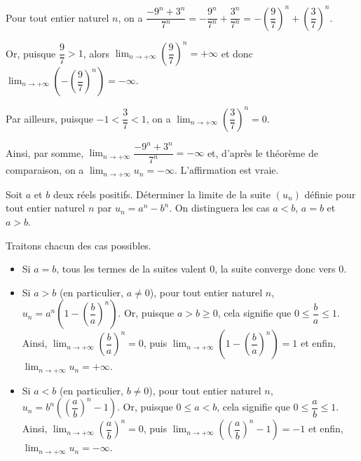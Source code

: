 \documentclass[11pt,fleqn, openany]{book} %
\begin{document}
\begin{solution}
Pour tout entier naturel $n$, on a $\dfrac{-9^n+3^n}{7^n}=-\dfrac{9^n}{7^n}+\dfrac{3^n}{7^n}=-\left(\dfrac{9}{7}\right)^n+\left(\dfrac{3}{7}\right)^n$.

Or, puisque $\dfrac{9}{7}>1$, alors $\displaystyle\lim_{n\to +\infty}\left(\dfrac{9}{7}\right)^n=+\infty$ et donc $\displaystyle\lim_{n\to +\infty}\left(-\left(\dfrac{9}{7}\right)^n\right)=-\infty$.

Par ailleurs, puisque $-1<\dfrac{3}{7}<1$, on a $\displaystyle\lim_{n\to +\infty}\left(\dfrac{3}{7}\right)^n=0$.

Ainsi, par somme, $\displaystyle\lim_{n\to +\infty}\dfrac{-9^n+3^n}{7^n}=-\infty$ et, d'après le théorème de comparaison, on a $\displaystyle\lim_{n \to +\infty}u_n=-\infty$. L'affirmation est vraie.
\end{solution}


\begin{exercise}
Soit $a$ et $b$ deux réels positifs. Déterminer la limite de la suite $(u_n)$ définie pour tout entier naturel $n$ par $u_n=a^n-b^n$. On distinguera les cas $a<b$, $a=b$ et $a>b$.
\newpage \end{exercise}

\begin{solution}Traitons chacun des cas possibles.
\begin{itemize}
\item Si $a=b$, tous les termes de la suites valent 0, la suite converge donc vers 0.
\item Si $a>b$ (en particulier, $a\neq 0$), pour tout entier naturel $n$, $u_n=a^n\left(1-\left( \dfrac{b}{a}\right)^n\right)$. Or, puisque $a>b \geqslant 0$, cela signifie que $0\leqslant \dfrac{b}{a} \leqslant 1$. Ainsi, $\displaystyle \lim_{n\to + \infty} \left(\dfrac{b}{a}\right)^n=0$, puis $\displaystyle \lim_{n\to + \infty} \left( 1-\left(\dfrac{b}{a}\right)^n\right)=1$ et enfin, $\displaystyle \lim_{n\to + \infty} u_n=+\infty$.
\item Si $a<b$ (en particulier, $b\neq 0$), pour tout entier naturel $n$, $u_n=b^n\left(\left( \dfrac{a}{b}\right)^n-1\right)$. Or, puisque $0\leqslant a<b $, cela signifie que $0\leqslant \dfrac{a}{b} \leqslant 1$. Ainsi, $\displaystyle \lim_{n\to + \infty} \left(\dfrac{a}{b}\right)^n=0$, puis $\displaystyle \lim_{n\to + \infty} \left( \left(\dfrac{a}{b}\right)^n-1\right)=-1$ et enfin, $\displaystyle \lim_{n\to + \infty} u_n=-\infty$.
\end{itemize}\end{solution}
\end{document}
